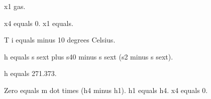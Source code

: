 x1 gas.

x4 equals 0.  
x1 equals.

T i equals minus 10 degrees Celsius. 

h equals s sext plus s40 minus s sext (s2 minus s sext). 

h equals 271.373.

Zero equals m dot times (h4 minus h1). h1 equals h4. x4 equals 0.